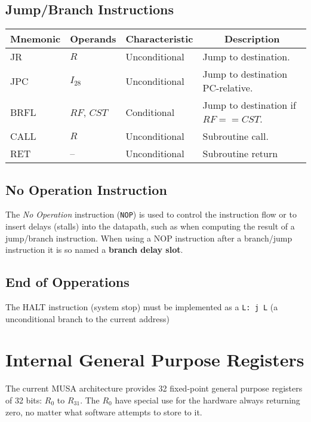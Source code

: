 \documentclass{article}
\begin{document}
  \subsection{Jump/Branch Instructions}

  \FloatBarrier
    \begin{table}[H]
      \begin{center}
		\begin{tabular}[pos]{| l | l | l | l |} \hline 	
	\multicolumn{1}{|c|}{\cellcolor[gray]{0.9}\textbf{Mnemonic}} &
	\multicolumn{1}{c|}{\cellcolor[gray]{0.9}\textbf{Operands}} &
	\multicolumn{1}{c|}{\cellcolor[gray]{0.9}\textbf{Characteristic}} &
	\multicolumn{1}{c|}{\cellcolor[gray]{0.9}\textbf{Description}} 			\\ \hline
	  JR  	& $R$ 		& Unconditional & Jump to destination. 			\\ \hline
	  JPC 	& $I_{28}$ 	& Unconditional & Jump to destination PC-relative. 	\\ \hline
	  BRFL 	& $RF$, $CST$ 	& Conditional 	& Jump to destination if $RF == CST$.\\ \hline
	  CALL   	& $R$		& Unconditional & Subroutine call.	\\ \hline
	  RET  	& -- 		& Unconditional & Subroutine return 			\\ \hline
	\end{tabular}
      \end{center}
    \end{table} 
  
  \subsection{No Operation Instruction}
  The \textit{No Operation} instruction (\texttt{NOP}) is used to control the instruction flow or to insert delays (stalls) into the datapath, such as when computing the result of a jump/branch instruction. When using a NOP instruction after a branch/jump instruction it is so named a \textbf{branch delay slot}.
  
  \subsection{End of Opperations}
  The HALT instruction (system stop) must be implemented as a \texttt{L: j L} (a unconditional branch to the current address)
  
  \section{Internal General Purpose Registers}
  \label{sec:register}
  The current MUSA architecture provides 32 fixed-point general purpose registers of 32 bits: $R_0$ to $R_{31}$. The $R_0$ have special use for the hardware always returning zero, no matter what software attempts to store to it.
\end{document}
